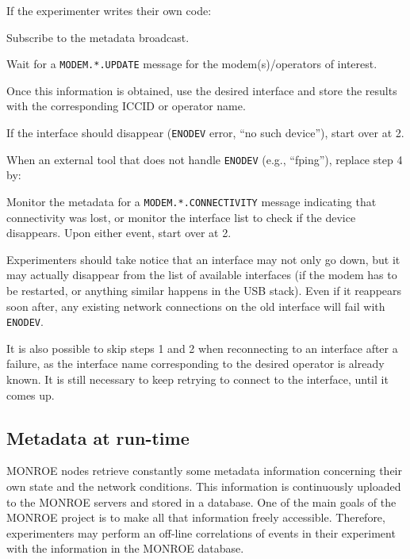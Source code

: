 \documentclass[a4paper,10pt]{article}
\newcommand{\monroe}{MONROE}
\newcommand{\identifier}[1]{{\texttt{\small{#1}}}}
\begin{document}
If the experimenter writes their own code:
\begin{enumerate*}
	\item Subscribe to the metadata broadcast.
	\item Wait for a \identifier{MODEM.*.UPDATE} message for the modem(s)/operators of interest.
	\item Once this information is obtained, use the desired interface and store the results with the corresponding ICCID or operator name.
	\item If the interface should disappear (\identifier{ENODEV} error, ``no such device''), start over at 2.
\end{enumerate*}
	
When an external tool that does not handle \identifier{ENODEV} (e.g., ``fping''), replace step 4 by:
\begin{itemize*}
	\item Monitor the metadata for a \identifier{MODEM.*.CONNECTIVITY} message indicating that connectivity was lost, or monitor the interface list to check if the device disappears. Upon either event, start over at 2.
\end{itemize*}
	
Experimenters should take notice that an interface may not only go down, but it may actually disappear from the list of available interfaces (if the modem has to be restarted, or anything similar happens in the USB stack).
Even if it reappears soon after, any existing network connections on the old interface will fail with \identifier{ENODEV}. 
	
It is also possible to skip steps 1 and 2 when reconnecting to an interface after a failure, as the interface name corresponding to the desired operator is already known.
It is still necessary to keep retrying to connect to the interface, until it comes up.

\subsection{Metadata at run-time}
\label{subsec:metadataRunTime}

\monroe{} nodes retrieve constantly some metadata information concerning their own state and the network conditions.
This information is continuously uploaded to the \monroe{} servers and stored in a database.
One of the main goals of the \monroe{} project is to make all that information freely accessible.
Therefore, experimenters may perform an off-line correlations of events in their experiment with the information in the \monroe{} database.
\end{document}
